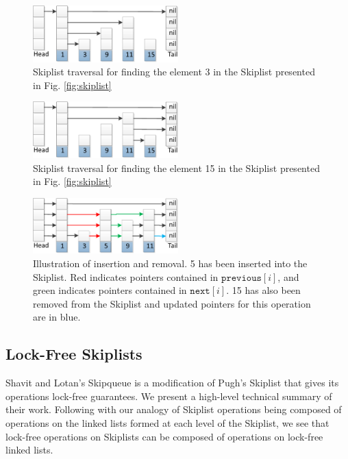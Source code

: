 \documentclass{acm_proc_article-sp}
\begin{document}
\begin{figure}[H]
  \includegraphics[width=0.5\textwidth]{img/skiplistSearch-crop.pdf}
  \caption{Skiplist traversal for finding the element 3 in the Skiplist presented in Fig. \ref{fig:skiplist}}
  \label{fig:skiplist:search3}
\end{figure}

\begin{figure}[H]
  \includegraphics[width=0.5\textwidth]{img/skiplistSearch15-crop.pdf}
  \caption{Skiplist traversal for finding the element 15 in the Skiplist presented in Fig. \ref{fig:skiplist}}
  \label{fig:skiplist:search15}
\end{figure}

\begin{figure}[H]
  \includegraphics[width=0.5\textwidth]{img/skiplistInsert5-crop.pdf}
  \caption{Illustration of insertion and removal. 5 has been inserted into the Skiplist. Red indicates pointers contained in $\texttt{previous}[i]$, and green indicates pointers contained in $\texttt{next}[i]$. 15 has also been removed from the Skiplist and updated pointers for this operation are in blue.}
  \label{fig:skiplist:insert5}
\end{figure}

\subsection{Lock-Free Skiplists}
Shavit and Lotan's Skipqueue \cite{shavit00} is a modification
of Pugh's Skiplist that gives its operations lock-free guarantees.
We present a high-level technical summary of their work.
Following with our analogy of Skiplist
operations being composed of operations on the linked lists formed at each level
of the Skiplist, we see that lock-free
operations on Skiplists can be composed of operations on lock-free linked lists.
\end{document}
